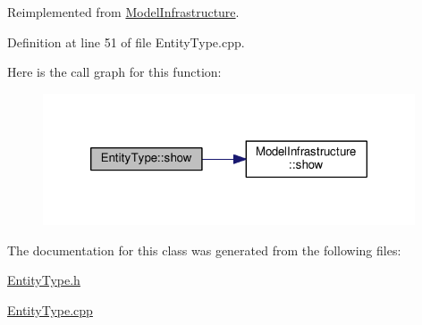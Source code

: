 Reimplemented from \hyperlink{class_model_infrastructure_a649a5a89a0c9931783d3c51de2acf266}{Model\-Infrastructure}.



Definition at line 51 of file Entity\-Type.\-cpp.



Here is the call graph for this function\-:\nopagebreak
\begin{figure}[H]
\begin{center}
\leavevmode
\includegraphics[width=312pt]{class_entity_type_ab5a696912b12a9f51decded90f368dea_cgraph}
\end{center}
\end{figure}




The documentation for this class was generated from the following files\-:\begin{DoxyCompactItemize}
\item 
\hyperlink{_entity_type_8h}{Entity\-Type.\-h}\item 
\hyperlink{_entity_type_8cpp}{Entity\-Type.\-cpp}\end{DoxyCompactItemize}

